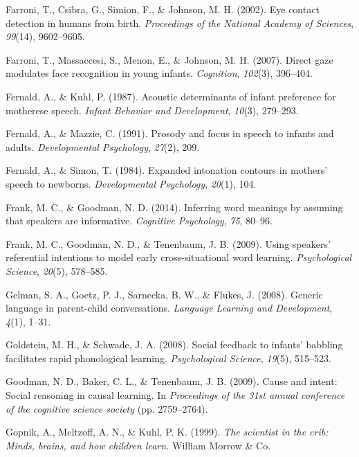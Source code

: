 \documentclass[a4paper,man,apacite,floatsintext]{apa6}
\begin{document}
\hypertarget{ref-farroni2002eye}{}
Farroni, T., Csibra, G., Simion, F., \& Johnson, M. H. (2002). Eye
contact detection in humans from birth. \emph{Proceedings of the
National Academy of Sciences}, \emph{99}(14), 9602--9605.

\hypertarget{ref-farroni2007direct}{}
Farroni, T., Massaccesi, S., Menon, E., \& Johnson, M. H. (2007). Direct
gaze modulates face recognition in young infants. \emph{Cognition},
\emph{102}(3), 396--404.

\hypertarget{ref-fernald1987acoustic}{}
Fernald, A., \& Kuhl, P. (1987). Acoustic determinants of infant
preference for motherese speech. \emph{Infant Behavior and Development},
\emph{10}(3), 279--293.

\hypertarget{ref-fernald1991prosody}{}
Fernald, A., \& Mazzie, C. (1991). Prosody and focus in speech to
infants and adults. \emph{Developmental Psychology}, \emph{27}(2), 209.

\hypertarget{ref-fernald1984expanded}{}
Fernald, A., \& Simon, T. (1984). Expanded intonation contours in
mothers' speech to newborns. \emph{Developmental Psychology},
\emph{20}(1), 104.

\hypertarget{ref-frank2014inferring}{}
Frank, M. C., \& Goodman, N. D. (2014). Inferring word meanings by
assuming that speakers are informative. \emph{Cognitive Psychology},
\emph{75}, 80--96.

\hypertarget{ref-frank2009using}{}
Frank, M. C., Goodman, N. D., \& Tenenbaum, J. B. (2009). Using
speakers' referential intentions to model early cross-situational word
learning. \emph{Psychological Science}, \emph{20}(5), 578--585.

\hypertarget{ref-gelman2008generic}{}
Gelman, S. A., Goetz, P. J., Sarnecka, B. W., \& Flukes, J. (2008).
Generic language in parent-child conversations. \emph{Language Learning
and Development}, \emph{4}(1), 1--31.

\hypertarget{ref-goldstein2008social}{}
Goldstein, M. H., \& Schwade, J. A. (2008). Social feedback to infants'
babbling facilitates rapid phonological learning. \emph{Psychological
Science}, \emph{19}(5), 515--523.

\hypertarget{ref-goodman2009cause}{}
Goodman, N. D., Baker, C. L., \& Tenenbaum, J. B. (2009). Cause and
intent: Social reasoning in causal learning. In \emph{Proceedings of the
31st annual conference of the cognitive science society} (pp.
2759--2764).

\hypertarget{ref-gopnik1999scientist}{}
Gopnik, A., Meltzoff, A. N., \& Kuhl, P. K. (1999). \emph{The scientist
in the crib: Minds, brains, and how children learn.} William Morrow \&
Co.
\end{document}
